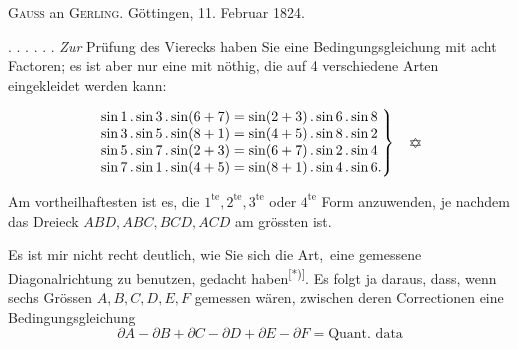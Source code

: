 \medskip
{\centering
[3.]\par{}\par\smallskip
\textsc{Gauss} an \textsc{Gerling}. \quad Göttingen, 11. Februar 1824.\par}

. . . . . . \textit{Zur} Prüfung des Vierecks haben Sie eine Bedingungsgleichung mit acht Factoren; es ist aber nur eine mit  nöthig, die auf 4 verschiedene Arten eingekleidet werden kann:

\begin{center}
\end{center}
\[
\left.\begin{array}{@{}l@{\;=\;}l@{}}
 \sin1\,.\sin3\,.\sin(6+7)&\sin(2+3)\,.\sin6\,.\sin8\\
 \sin3\,.\sin5\,.\sin(8+1)&\sin(4+5)\,.\sin8\,.\sin2\\
 \sin5\,.\sin7\,.\sin(2+3)&\sin(6+7)\,.\sin2\,.\sin4\\
 \sin7\,.\sin1\,.\sin(4+5)&\sin(8+1)\,.\sin4\,.\sin6.
\end{array}\right\}\quad\text{\tikz[baseline=-.55ex,x=1mm,y=1mm,line width=.4pt]{\draw (0,1.2)--(-1.25,-.6)--(1.25,-.6)--cycle;\draw (0,-1.2)--(-1.25,.6)--(1.25,.6)--cycle;}}
\]

Am vortheilhaftesten ist es, die \(1^{\mathrm{te}},2^{\mathrm{te}},3^{\mathrm{te}}\) oder \(4^{\mathrm{te}}\) Form anzuwenden, je nachdem das Dreieck \(ABD,ABC,BCD,ACD\) am grössten ist.

Es ist mir nicht recht deutlich, wie Sie sich die Art, \,eine gemessene Diagonalrichtung zu benutzen, gedacht haben\textsuperscript{[*)]}. Es folgt ja daraus, dass, wenn sechs Grössen \(A,B,C,D,E,F\) gemessen wären, zwischen deren Correctionen eine Bedingungsgleichung
\[
 \partial A-\partial B+\partial C-\partial D+\partial E-\partial F=\text{Quant. data}
\]

